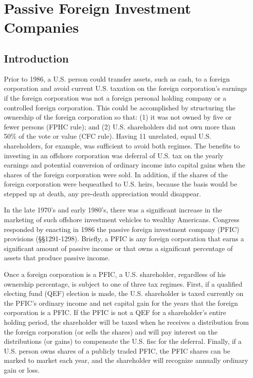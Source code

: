 \chapter{Passive Foreign Investment Companies}

	\section{Introduction}
	
	Prior to 1986, a U.S. person could transfer assets, such as cash, to a foreign corporation and avoid current U.S. taxation on the foreign corporation's earnings if the foreign corporation was not a foreign personal holding company or a controlled foreign corporation.  This could be accomplished by structuring the ownership of the foreign corporation so that: (1) it was not owned by five or fewer persons (FPHC rule); and (2) U.S. shareholders did not own more than 50\% of the vote or value (CFC rule).  Having 11 unrelated, equal U.S. shareholders, for example, was sufficient to avoid both regimes.  The benefits to investing in an offshore corporation was deferral of U.S. tax on the yearly earnings and potential conversion of ordinary income into capital gains when the shares of the foreign corporation were sold.  In addition, if the shares of the foreign corporation were bequeathed to U.S. heirs, because the basis would be stepped up at death, any pre-death appreciation would disappear.  
	
	In the late 1970's and early 1980's, there was a significant increase in the marketing of such offshore investment vehicles to wealthy Americans.  Congress responded by enacting in 1986 the passive foreign investment company (PFIC) provisions (\S\S 1291-1298).  Briefly, a PFIC is any foreign corporation that earns a significant amount of passive income or that owns a significant percentage of assets that produce passive income.  
	
	Once a foreign corporation is a PFIC, a U.S. shareholder, regardless of his ownership percentage, is subject to one of three tax regimes.  First, if a qualified electing fund (QEF) election is made, the U.S. shareholder is taxed currently on the PFIC's ordinary income and net capital gain for the years that the foreign corporation is a PFIC.  If the PFIC is not a QEF for a shareholder's entire holding period, the shareholder will be taxed when he receives a distribution from the foreign corporation (or sells the shares) and will pay interest on the distributions (or gains) to compensate the U.S. fisc for the deferral.  Finally, if a U.S. person owns shares of a publicly traded PFIC, the PFIC shares can be marked to market each year, and the shareholder will recognize annually ordinary gain or loss.
	
